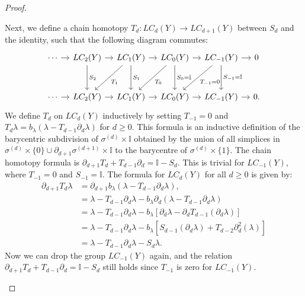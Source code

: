 \begin{proof}{\textit{\cite[Proof of Proposition 2.21]{hatcher2005algebraic}}}
\begin{enumerate}
	Next, we define a chain homotopy $T_d: LC_d(Y) \rightarrow LC_{d+1}(Y)$ between $S_d$ and the identity, such that the following diagram commutes:
	\begin{equation}
			\begin{tikzcd}[row sep=3em, column sep = 1em]
				\cdots \arrow[r] & LC_2(Y) \arrow[r] \arrow[d, "S_2"] & LC_1(Y) \arrow[r] \arrow[ld, "T_1"] \arrow[d, "S_1"] & LC_0(Y) \arrow[r] \arrow[ld, "T_0"] \arrow[d, "{S_0 = \mathbb{I}}"] & LC_{-1}(Y) \arrow[r] \arrow[ld, "{T_{-1} = 0}"] \arrow[d, "{S_{-1} = \mathbb{I}}"] & 0 \\
				\cdots \arrow[r] & LC_2(Y) \arrow[r]                & LC_1(Y) \arrow[r]                                & LC_0(Y) \arrow[r]                                             & LC_{-1}(Y) \arrow[r]                                                 & 0.
			\end{tikzcd}
	\end{equation}
	We define $T_d$ on $LC_d(Y)$ inductively by setting $T_{-1}=0$ and $T_d\lambda = b_\lambda(\lambda-T_{d-1}\partial_d\lambda)$ for $d \geq 0$. This formula is an inductive definition of the barycentric subdivision of $\sigma^{(d)} \times \mathbb{I}$ obtained by the union of all simplices in $\sigma^{(d)} \times \{0\} \cup \partial_{d+1} \sigma^{(d+1)} \times \mathbb{I}$ to the barycentre of $\sigma^{(d)} \times \{1\}$. The chain homotopy formula is $\partial_{d+1} T_{d} + T_{d-1}\partial_{d} = \mathbb{I} - S_{d}$. This is trivial for $LC_{-1}(Y)$, where $T_{-1}=0$ and $S_{-1}=\mathbb{I}$. The formula for $LC_d(Y)$ for all $d \geq 0$ is given by:
	\begin{align}
		\partial_{d+1} T_d\lambda & = \partial_{d+1} b_\lambda(\lambda - T_{d-1}\partial_{d
		}\lambda), \nonumber\\
		                  & = \lambda - T_{d-1}\partial_{d}\lambda - b_\lambda\partial_d(\lambda - T_{d-1}\partial_{d}\lambda) \nonumber\\
		                  & = \lambda - T_{d-1}\partial_d\lambda - b_\lambda[\partial_d\lambda - \partial_d T_{d-1}(\partial_d\lambda)] \nonumber\\
		                  & = \lambda - T_{d-1}\partial_d\lambda - b_\lambda[S_{d-1}(\partial_d\lambda) + T_{d-2}\partial^2_d(\lambda)] \nonumber\\
		                  & = \lambda - T_{d-1}\partial_d\lambda - S_d\lambda.                                                  
	\end{align}
	Now we can drop the group $LC_{-1}(Y)$ again, and the relation $\partial_{d+1} T_{d} + T_{d-1}\partial_{d} = \mathbb{I} - S_d$ still holds since $T_{-1}$ is zero for $LC_{-1}(Y)$.
		

\end{enumerate}
\end{proof}
